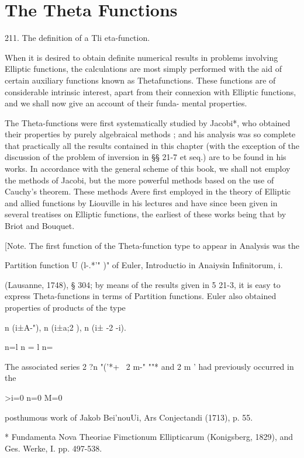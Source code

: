 \chapter{The Theta Functions} 

211. The definition of a Tli eta-function. 

When it is desired to obtain definite numerical results in problems 
involving Elliptic functions, the calculations are most simply performed 
with the aid of certain auxiliary functions known as Thetafunctions. These 
functions are of considerable intrinsic interest, apart from their connexion 
with Elliptic functions, and we shall now give an account of their funda- 
mental properties. 

The Theta-functions were first systematically studied by Jacobi*, who 
obtained their properties by purely algebraical methods ; and his analysis 
was so complete that practically all the results contained in this chapter 
(with the exception of the discussion of the problem of inversion in §§ 21-7 
et seq.) are to be found in his works. In accordance with the general scheme 
of this book, we shall not employ the methods of Jacobi, but the more 
powerful methods based on the use of Cauchy's theorem. These methods 
Avere first employed in the theory of Elliptic and allied functions by Liouville 
in his lectures and have since been given in several treatises on Elliptic 
functions, the earliest of these works being that by Briot and Bouquet. 

[Note. The first function of the Theta-function type to appear in Analysis was the 

Partition function  U (l-.*'" )"  of Euler, Introductio in Anaiysin Infinitorum, i. 

(Lausanne, 1748), § 304; by means of the results given in 5  21-3, it is easy to express 
Theta-functions in terms of Partition functions. Euler also obtained properties of products 
of the type 

n (i±A-"), n (i±a;2 ), n (i± -2 -i). 

n=l n = l n=\ 

The associated series 2 ?n "('*+ \ 2 m-" ""*   and 2 m ' had previously occurred in the 

>i=0 n=0 M=0 

posthumous work of Jakob Bei'nouUi, Ars Conjectandi (1713), p. 55. 

* Fundamenta Nova Theoriae Fimctionum Ellipticarum (Konigsberg, 1829), and Ges. Werke, 
I. pp. 497-538. 

